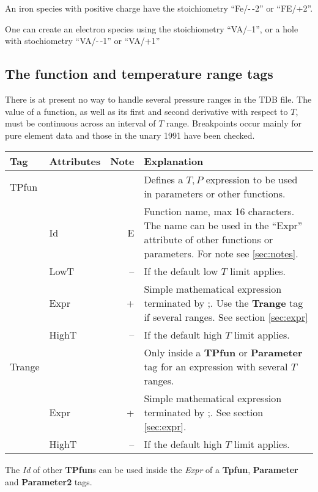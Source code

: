 \documentclass{article}
\begin{document}
An iron species with positive charge have the stoichiometry
``Fe/-\,-2'' or ``FE/+2''.

One can create an electron species using the stoichiometry ``VA/--1'', or a
hole with stochiometry ``VA/-\,-1'' or ``VA/+1''

\newpage 

\subsection{The function and temperature range tags}\label{sec:tpfun}

There is at present no way to handle several pressure ranges in the
TDB file.  The value of a function, as well as its first and second
derivative with respect to $T$, must be continuous across an interval
of $T$ range.  Breakpoints occur mainly for pure element data and
those in the unary 1991 have been checked.

\bigskip
\begin{tabular}{|p{} p{} r p{}|}\hline
  Tag & Attributes & Note & Explanation\\\hline

  TPfun & && Defines a $T, P$ expression to be used in parameters or other functions.\\
        & Id & E & Function name, max 16 characters. The name can be used in the ``Expr'' attribute of other functions or parameters.  For note see \ref{sec:notes}.\\
        & LowT & -- & If the default low $T$ limit applies.\\
        & Expr & + & Simple mathematical expression terminated by ;.   Use the {\bf Trange} tag if several ranges.  See section \ref{sec:expr}\\
        & HighT & -- & If the default high $T$ limit applies.\\\hline

  Trange & && Only inside a {\bf TPfun} or {\bf Parameter} tag for an expression with several $T$ ranges.\\ 
         & Expr & + & Simple mathematical expression terminated by ;.  See section \ref{sec:expr}.\\
         & HighT & -- & If the default high $T$ limit applies.\\\hline
\end{tabular}

\bigskip
The {\em Id} of other {\bf TPfun}s can be used inside the {\em Expr}
of a {\bf Tpfun}, {\bf Parameter} and {\bf Parameter2} tags.
\end{document}
